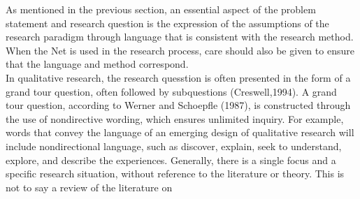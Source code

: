 \documentclass{book}
\begin{document}
As mentioned in the previous section, an essential aspect of the problem statement and research question is the expression of the assumptions of the research paradigm through language that is consistent with the research method. When the Net is used in the research process, care should also be given to ensure that the language and method correspond.
\\\hspace*{0.5cm} In qualitative research, the research quesstion is often presented in the form of a grand tour question, often followed by subquestions (Creswell,1994). A grand tour question, according to Werner and Schoepfle (1987), is constructed through the use of nondirective wording, which ensures unlimited inquiry. For example, words that convey the language of an emerging design of qualitative research will include nondirectional language, such as discover, explain, seek to understand, explore, and describe the experiences. Generally, there is a single focus and a specific research situation, without reference to the literature or theory. This is not to say a review of the literature on
\end{document}

